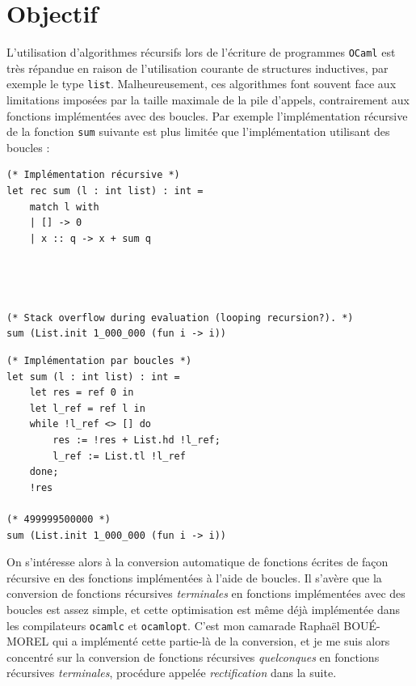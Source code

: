 \section{Objectif}

L'utilisation d'algorithmes récursifs lors de l'écriture de programmes
\texttt{OCaml} est très répandue en raison de l'utilisation courante de
structures inductives, par exemple le type \texttt{list}. Malheureusement, ces
algorithmes font souvent face aux limitations imposées par la taille maximale de
la pile d'appels, contrairement aux fonctions implémentées avec des boucles. Par
exemple l'implémentation récursive de la fonction \texttt{sum} suivante est plus
limitée que l'implémentation utilisant des boucles :

\bigskip
\small
\begin{minipage}[t]{0.5\textwidth}
    \begin{verbatim}
(* Implémentation récursive *)
let rec sum (l : int list) : int =
    match l with
    | [] -> 0
    | x :: q -> x + sum q




(* Stack overflow during evaluation (looping recursion?). *)
sum (List.init 1_000_000 (fun i -> i))
    \end{verbatim}
\end{minipage}%
\begin{minipage}[t]{0.5\textwidth}
    \begin{verbatim}
(* Implémentation par boucles *)
let sum (l : int list) : int =
    let res = ref 0 in
    let l_ref = ref l in
    while !l_ref <> [] do
        res := !res + List.hd !l_ref;
        l_ref := List.tl !l_ref
    done;
    !res

(* 499999500000 *)
sum (List.init 1_000_000 (fun i -> i))
    \end{verbatim}
\end{minipage}
\normalsize

\bigskip

On s'intéresse alors à la conversion automatique de fonctions écrites de façon
récursive en des fonctions implémentées à l'aide de boucles. Il s'avère que la
conversion de fonctions récursives \textit{terminales} en fonctions implémentées
avec des boucles est assez simple, et cette optimisation est même déjà
implémentée dans les compilateurs \texttt{ocamlc} et \texttt{ocamlopt}. C'est
mon camarade Raphaël BOUÉ-MOREL qui a implémenté cette partie-là de la
conversion, et je me suis alors concentré sur la conversion de fonctions
récursives \textit{quelconques} en fonctions récursives \textit{terminales},
procédure appelée \textit{rectification} dans la suite.
